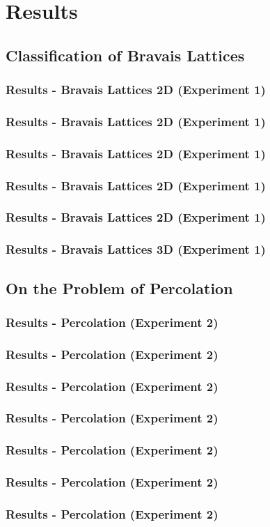 \documentclass{beamer}
\begin{document}
\section{Results}
\subsection{Classification of Bravais Lattices}
\begin{frame}
    \frametitle{Results - Bravais Lattices 2D (Experiment 1)}
    
\end{frame}
\begin{frame}
    \frametitle{Results - Bravais Lattices 2D (Experiment 1)}
    
\end{frame}
\begin{frame}
    \frametitle{Results - Bravais Lattices 2D (Experiment 1)}
    
\end{frame}
\begin{frame}
    \frametitle{Results - Bravais Lattices 2D (Experiment 1)}
    
\end{frame}
\begin{frame}
    \frametitle{Results - Bravais Lattices 2D (Experiment 1)}
    
\end{frame}
\begin{frame}
    \frametitle{Results - Bravais Lattices 3D (Experiment 1)}
    
\end{frame}
\subsection{On the Problem of Percolation}
\begin{frame}
    \frametitle{Results - Percolation (Experiment 2)}
    
\end{frame}
\begin{frame}
    \frametitle{Results - Percolation (Experiment 2)}
    
\end{frame}
\begin{frame}
    \frametitle{Results - Percolation (Experiment 2)}
    
\end{frame}
\begin{frame}
    \frametitle{Results - Percolation (Experiment 2)}
    
\end{frame}
\begin{frame}
    \frametitle{Results - Percolation (Experiment 2)}
    
\end{frame}
\begin{frame}
    \frametitle{Results - Percolation (Experiment 2)}
    
\end{frame}
\begin{frame}
    \frametitle{Results - Percolation (Experiment 2)}
    
\end{frame}
\end{document}
